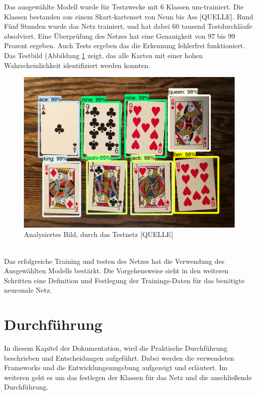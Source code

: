 \documentclass[a4paper,12pt,oneside]{article}
\begin{document}
Das ausgewählte Modell wurde für Testzwecke mit 6 Klassen um-trainiert. Die Klassen bestanden aus einem Skart-kartenset von Neun bis Ass [QUELLE]. Rund Fünf Stunden wurde das Netz trainiert, und hat dabei 60 tausend Testdurchläufe absolviert. Eine Überprüfung des Netzes hat eine Genauigkeit von 97 bis 99 Prozent ergeben. Auch Tests ergeben das die Erkennung fehlerfrei funktioniert. Das Testbild (Abbildung \ref{img:Kartenset} zeigt, das alle Karten mit einer hohen Wahrscheinlichkeit identifiziert werden konnten.
\\
\begin{figure}
    [h]
	\centering
	\includegraphics[scale=0.5]{Sources/kartenset.png}
	\caption{Analysiertes Bild, durch das Testnetz [QUELLE]}
	\label{img:Kartenset}
\end{figure}
\\
Das erfolgreiche Training und testen des Netzes hat die Verwendung des Ausgewählten Modells bestärkt. Die Vorgehensweise sieht in den weiteren Schritten eine Definition und Festlegung der Trainings-Daten für das benötigte neuronale Netz. 

\newpage

  \section{Durchführung}
In diesem Kapitel der Dokumentation, wird die Praktische Durchführung beschrieben und Entscheidungen aufgeführt. Dabei werden die verwendeten Frameworks und die Entwicklungsumgebung aufgezeigt und erläutert. Im weiteren geht es um das festlegen der Klassen für das Netz und die anschließende Durchführung.
\end{document}
